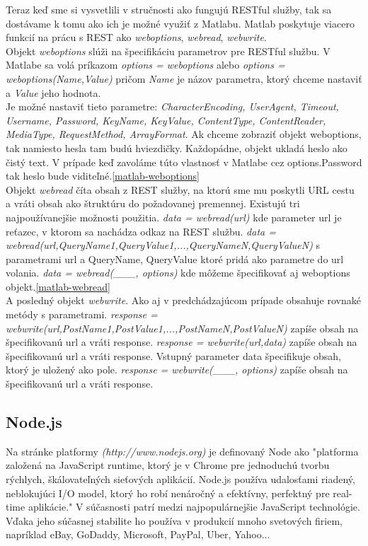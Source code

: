Teraz keď sme si vysvetlili v stručnosti ako fungujú RESTful služby, tak sa dostávame k tomu ako ich je možné využiť z Matlabu. Matlab poskytuje viacero funkcií na prácu s REST ako \textit{weboptions}, \textit{webread}, \textit{webwrite}.\\
Objekt \textit{weboptions} slúži na špecifikáciu parametrov pre RESTful službu. V Matlabe sa volá príkazom \textit{options = weboptions} alebo \textit{options = weboptions(Name,Value)} pričom \textit{Name} je názov parametra, ktorý chceme nastaviť a \textit{Value} jeho hodnota.\\
Je možné nastaviť tieto parametre: \textit{CharacterEncoding, UserAgent, Timeout, Username, Password, KeyName, KeyValue, ContentType, ContentReader, MediaType, RequestMethod, ArrayFormat}. Ak chceme zobraziť objekt weboptions, tak namiesto hesla tam budú hviezdičky. Každopádne, objekt ukladá heslo ako čistý text. V prípade keď zavoláme túto vlastnosť v Matlabe cez options.Password tak heslo bude viditeľné.\ref{matlab-weboptions}\\
Objekt \textit{webread} číta obsah z REST služby, na ktorú sme mu poskytli URL cestu a vráti obsah ako štruktúru do požadovanej premennej. Existujú tri najpoužívanejšie možnosti použitia. \textit{data = webread(url)} kde parameter url je reťazec, v ktorom sa nachádza odkaz na REST službu. \textit{data = webread(url,QueryName1,QueryValue1,...,QueryNameN,QueryValueN)} s parametrami url a QueryName, QueryValue ktoré pridá ako parametre do url volania. \textit{data = webread(\_\_\_, options)} kde môžeme špecifikovať aj weboptions objekt.\ref{matlab-webread}\\
A posledný objekt \textit{webwrite}. Ako aj v predchádzajúcom prípade obsahuje rovnaké metódy s parametrami. \textit{response = webwrite(url,PostName1,PostValue1,...,PostNameN,PostValueN)} zapíše obsah na špecifikovanú url a vráti response. \textit{response = webwrite(url,data)} zapíše obsah na špecifikovanú url a vráti response. Vstupný parameter data špecifikuje obsah, ktorý je uložený ako pole. \textit{response = webwrite(\_\_\_, options)} zapíše obsah na špecifikovanú url a vráti response.

\subsection{Node.js}
Na stránke platformy \textit{(http://www.nodejs.org)} je definovaný Node ako "platforma založená na JavaScript runtime, ktorý je v Chrome pre jednoduchú tvorbu rýchlych, škálovateľných sieťových aplikácií. Node.js používa udalosťami riadený, neblokujúci I/O model, ktorý ho robí nenáročný a efektívny, perfektný pre real-time aplikácie." V súčasnosti patrí medzi najpopulárnejšie JavaScript technológie.\\
Vďaka jeho súčasnej stabilite ho používa v produkcií mnoho svetových firiem, napríklad eBay, GoDaddy, Microsoft, PayPal, Uber, Yahoo...

